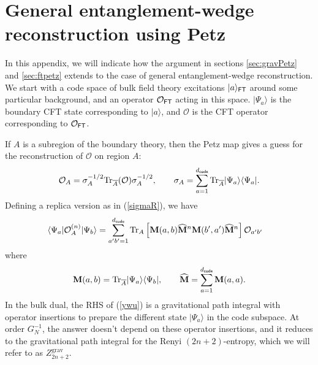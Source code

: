 \documentclass[11pt]{article}
\newcommand{\be}{\begin{equation}}
\newcommand{\ee}{\end{equation}}
\numberwithin{equation}{section}
\def\tr{\text{Tr}}
\begin{document}
\section{General entanglement-wedge reconstruction using Petz}\label{app:ew}

In this appendix, we will indicate how the argument in sections \ref{sec:gravPetz} and \ref{sec:ftpetz} extends to the case of general entanglement-wedge reconstruction. We start with a code space of bulk field theory excitations $|a\rangle_{\sf{FT}}$ around some particular background, and an operator $\mathcal{O}_{\sf FT}$ acting in this space. $|\Psi_a\rangle$ is the boundary CFT state corresponding to $|a\rangle$, and $\mathcal{O}$ is the CFT operator corresponding to $\mathcal{O}_{\sf FT}$.

If $A$ is a subregion of the boundary theory, then the Petz map gives a guess for the reconstruction of $\mathcal{O}$ on region $A$:
\be
\mathcal{O}_A = \sigma_A^{-1/2}\tr_{\overline A}(\mathcal{O})\sigma_A^{-1/2}, \hspace{20pt}\sigma_A = \sum_{a = 1}^{d_{\sf{code}}}\tr_{\overline A}|\Psi_a\rangle\langle \Psi_a|.
\ee
Defining a replica version as in (\ref{sigmaR}), we have
\begin{align}
\langle \Psi_a|\mathcal{O}_A^{(n)}|\Psi_b\rangle &= \sum_{a'b'=1}^{d_{\sf code}}\tr_A\left[{\bf M}(a,b)\widehat{\bf M}^n {\bf M}(b',a')\widehat{\bf M}^n\right]\mathcal{O}_{a'b'}\label{ywu}
\end{align}
where 
\be
{\bf M}(a,b) = \tr_{\overline A}|\Psi_a\rangle\langle \Psi_b|, \hspace{20pt} \widehat{\bf M} = \sum_{a = 1}^{d_{\sf code}}{\bf M}(a,a).
\ee
In the bulk dual, the RHS of (\ref{ywu}) is a gravitational path integral with operator insertions to prepare the different state $|\Psi_a\rangle$ in the code subspace. At order $G_N^{-1}$, the answer doesn't depend on these operator insertions, and it reduces to the gravitational path integral for the Renyi $(2n+2)$-entropy, which we will refer to as $Z^{\text{grav}}_{2n+2}$.
\end{document}
